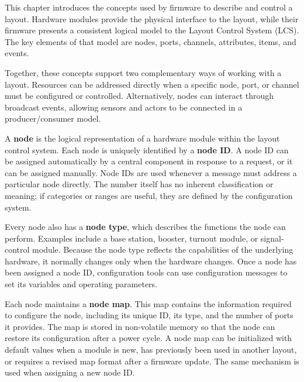 %
%
%

This chapter introduces the concepts used by firmware to describe and control a layout. Hardware modules provide the physical interface to the layout, while their firmware presents a consistent logical model to the Layout Control System (LCS). The key elements of that model are nodes, ports, channels, attributes, items, and events.

Together, these concepts support two complementary ways of working with a layout. Resources can be addressed directly when a specific node, port, or channel must be configured or controlled. Alternatively, nodes can interact through broadcast events, allowing sensors and actors to be connected in a producer/consumer model.



A \textbf{node} is the logical representation of a hardware module within the layout control system. Each node is uniquely identified by a \textbf{node ID}. A node ID can be assigned automatically by a central component in response to a request, or it can be assigned manually. Node IDs are used whenever a message must address a particular node directly. The number itself has no inherent classification or meaning; if categories or ranges are useful, they are defined by the configuration system.

Every node also has a \textbf{node type}, which describes the functions the node can perform. Examples include a base station, booster, turnout module, or signal-control module. Because the node type reflects the capabilities of the underlying hardware, it normally changes only when the hardware changes. Once a node has been assigned a node ID, configuration tools can use configuration messages to set its variables and operating parameters.

Each node maintains a \textbf{node map}. This map contains the information required to configure the node, including its unique ID, its type, and the number of ports it provides. The map is stored in non-volatile memory so that the node can restore its configuration after a power cycle. A node map can be initialized with default values when a module is new, has previously been used in another layout, or requires a revised map format after a firmware update. The same mechanism is used when assigning a new node ID.


